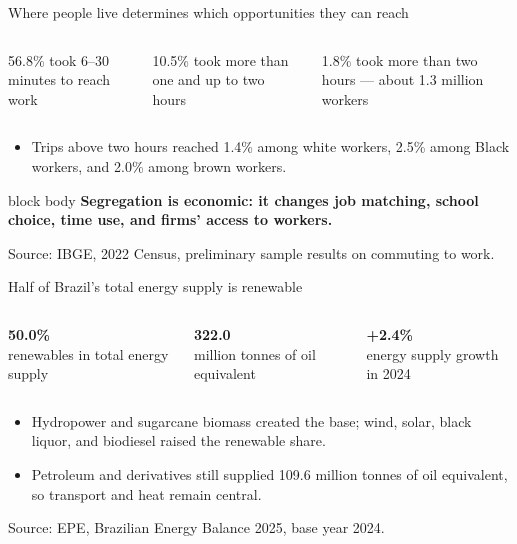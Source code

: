 \documentclass[10pt,aspectratio=169]{beamer}
\newcommand{\source}[1]{%
  \par\vfill{\tiny\color{MidGray}Source: #1}}
\newcommand{\muted}[1]{\textcolor{MidGray}{#1}}
\newcommand{\question}[1]{%
  \begin{beamercolorbox}[rounded=true,sep=0.55em,wd=\textwidth]{block body}
    \centering\large\textbf{#1}
  \end{beamercolorbox}}
\begin{document}
\begin{frame}{Where people live determines which opportunities they can reach}
  \begin{columns}[T,onlytextwidth]
      \begin{block}{56.8\%}
        \centering
        took 6--30 minutes to reach work
      \end{block}
      \begin{block}{10.5\%}
        \centering
        took more than one and up to two hours
      \end{block}
      \begin{block}{1.8\%}
        \centering
        took more than two hours --- about 1.3 million workers
      \end{block}
  \end{columns}
  \vspace{.45cm}
  \begin{itemize}
    \item Trips above two hours reached 1.4\% among white workers, 2.5\% among Black workers, and 2.0\% among brown workers.
  \end{itemize}
  \question{Segregation is economic: it changes job matching, school choice, time use, and firms' access to workers.}
  \source{IBGE, 2022 Census, preliminary sample results on commuting to work.}
\end{frame}

\begin{frame}{Half of Brazil's total energy supply is renewable}
  \begin{columns}[T,onlytextwidth]
      \begin{center}
        {\fontsize{32}{36}\selectfont\color{BrazilGreen}\textbf{50.0\%}}\\[-.05cm]
        \muted{renewables in total energy supply}
      \end{center}
      \begin{center}
        {\fontsize{32}{36}\selectfont\color{DeepNavy}\textbf{322.0}}\\[-.05cm]
        \muted{million tonnes of oil equivalent}
      \end{center}
      \begin{center}
        {\fontsize{32}{36}\selectfont\color{WarmGold}\textbf{+2.4\%}}\\[-.05cm]
        \muted{energy supply growth in 2024}
      \end{center}
  \end{columns}
  \vspace{.5cm}
  \begin{itemize}
    \item Hydropower and sugarcane biomass created the base; wind, solar, black liquor, and biodiesel raised the renewable share.
    \item Petroleum and derivatives still supplied 109.6 million tonnes of oil equivalent, so transport and heat remain central.
  \end{itemize}
  \source{EPE, Brazilian Energy Balance 2025, base year 2024.}
\end{frame}
\end{document}

